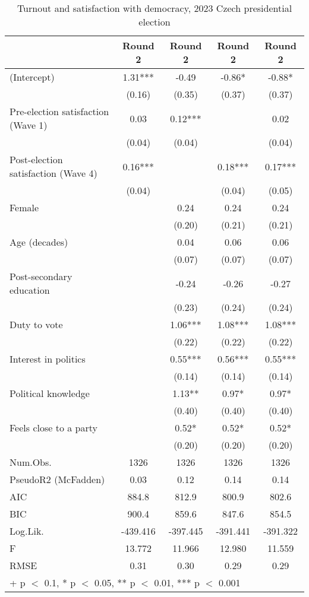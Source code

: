 \begin{table}

\caption{Turnout and satisfaction with democracy, 2023 Czech presidential election}
\centering
\begin{tabular}[t]{lcccc}
\toprule
  & Round 2 & Round 2  & Round 2   & Round 2   \\
\midrule
(Intercept) & 1.31*** & -0.49 & -0.86* & -0.88*\\
 & (0.16) & (0.35) & (0.37) & (0.37)\\
Pre-election satisfaction (Wave 1) & 0.03 & 0.12*** &  & 0.02\\
 & (0.04) & (0.04) &  & (0.04)\\
Post-election satisfaction (Wave 4) & 0.16*** &  & 0.18*** & 0.17***\\
 & (0.04) &  & (0.04) & (0.05)\\
Female &  & 0.24 & 0.24 & 0.24\\
 &  & (0.20) & (0.21) & (0.21)\\
Age (decades) &  & 0.04 & 0.06 & 0.06\\
 &  & (0.07) & (0.07) & (0.07)\\
Post-secondary education &  & -0.24 & -0.26 & -0.27\\
 &  & (0.23) & (0.24) & (0.24)\\
Duty to vote &  & 1.06*** & 1.08*** & 1.08***\\
 &  & (0.22) & (0.22) & (0.22)\\
Interest in politics &  & 0.55*** & 0.56*** & 0.55***\\
 &  & (0.14) & (0.14) & (0.14)\\
Political knowledge &  & 1.13** & 0.97* & 0.97*\\
 &  & (0.40) & (0.40) & (0.40)\\
Feels close to a party &  & 0.52* & 0.52* & 0.52*\\
 &  & (0.20) & (0.20) & (0.20)\\
\midrule
Num.Obs. & 1326 & 1326 & 1326 & 1326\\
PseudoR2 (McFadden) & 0.03 & 0.12 & 0.14 & 0.14\\
AIC & 884.8 & 812.9 & 800.9 & 802.6\\
BIC & 900.4 & 859.6 & 847.6 & 854.5\\
Log.Lik. & -439.416 & -397.445 & -391.441 & -391.322\\
F & 13.772 & 11.966 & 12.980 & 11.559\\
RMSE & 0.31 & 0.30 & 0.29 & 0.29\\
\bottomrule
\multicolumn{5}{l}{\rule{0pt}{1em}+ p $<$ 0.1, * p $<$ 0.05, ** p $<$ 0.01, *** p $<$ 0.001}\\
\end{tabular}
\end{table}
